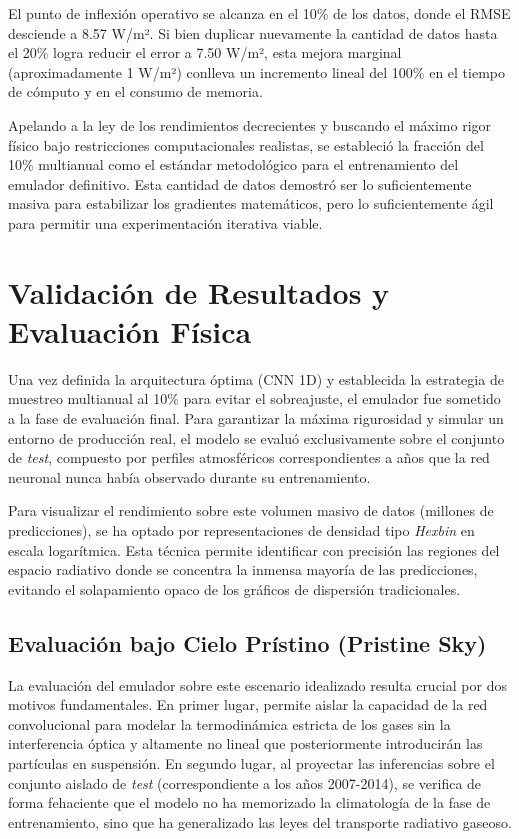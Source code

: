 \documentclass[11pt,a4paper,twoside,pdf]{article}
\numberwithin{equation}{section}
\begin{document}
El punto de inflexión operativo se alcanza en el 10\% de los datos, donde el RMSE desciende a 8.57 W/m². Si bien duplicar nuevamente la cantidad de datos hasta el 20\% logra reducir el error a 7.50 W/m², esta mejora marginal (aproximadamente 1 W/m²) conlleva un incremento lineal del 100\% en el tiempo de cómputo y en el consumo de memoria. 

Apelando a la ley de los rendimientos decrecientes y buscando el máximo rigor físico bajo restricciones computacionales realistas, se estableció la fracción del 10\% multianual como el estándar metodológico para el entrenamiento del emulador definitivo. Esta cantidad de datos demostró ser lo suficientemente masiva para estabilizar los gradientes matemáticos, pero lo suficientemente ágil para permitir una experimentación iterativa viable.

\newpage

\section{Validación de Resultados y Evaluación Física}

Una vez definida la arquitectura óptima (CNN 1D) y establecida la 
estrategia de muestreo multianual al 10\% para evitar el sobreajuste,
el emulador fue sometido a la fase de evaluación final. Para garantizar 
la máxima rigurosidad y simular un entorno de producción real, el modelo se
evaluó exclusivamente sobre el conjunto de \textit{test}, compuesto 
por perfiles atmosféricos correspondientes a años que la red neuronal nunca
había observado durante su entrenamiento.

Para visualizar el rendimiento sobre este volumen masivo
de datos (millones de predicciones), se ha optado por representaciones 
de densidad tipo \textit{Hexbin} en escala logarítmica. Esta técnica 
permite identificar con precisión las regiones del espacio radiativo 
donde se concentra la inmensa mayoría de las predicciones, evitando 
el solapamiento opaco de los gráficos de dispersión tradicionales.

\subsection{Evaluación bajo Cielo Prístino (Pristine Sky)}

La evaluación del emulador sobre este escenario idealizado resulta crucial por dos motivos fundamentales. En primer lugar, permite aislar la capacidad de la red convolucional para modelar la termodinámica estricta de los gases sin la interferencia óptica y altamente no lineal que posteriormente introducirán las partículas en suspensión. En segundo lugar, al proyectar las inferencias sobre el conjunto aislado de \textit{test} (correspondiente a los años 2007-2014), se verifica de forma fehaciente que el modelo no ha memorizado la climatología de la fase de entrenamiento, sino que ha generalizado las leyes del transporte radiativo gaseoso.
\end{document}
